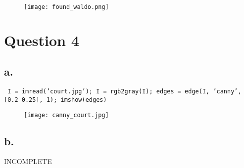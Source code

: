 \documentclass{article}
\begin{document}
\begin{figure}[h!]
\centering
\texttt{[image: found\_waldo.png]}
\label{fig:sample graph}
\end{figure}

\newpage

\section*{Question 4}
\subsection*{a.}
\texttt{\noindent
I = imread('court.jpg');
\newline
I = rgb2gray(I);
\newline
edges = edge(I, 'canny', [0.2 0.25], 1);
\newline
imshow(edges)
}

\begin{figure}[h!]
\centering
\texttt{[image: canny\_court.jpg]}
\label{fig:sample graph}
\end{figure}


\subsection*{b.}
INCOMPLETE
\end{document}
